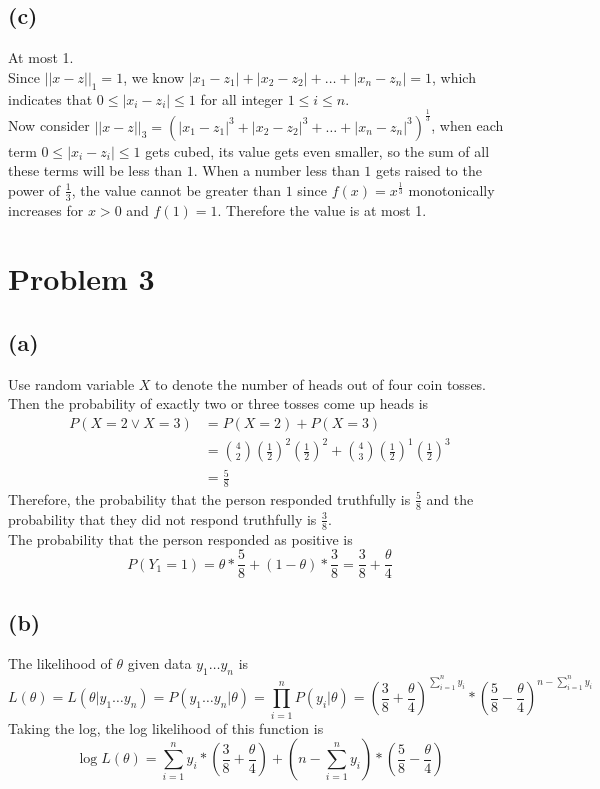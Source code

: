 \documentclass[11pt]{article}
\begin{document}
\subsection{(c)}
At most 1. \\
Since $||x-z||_1=1$, we know $|x_1-z_1|+|x_2-z_2|+\ldots+|x_n-z_n|=1$, which indicates that $0\leq|x_i-z_i|\leq1$ for all integer $1\leq i\leq n$. \\
Now consider $||x-z||_3=(|x_1-z_1|^3+|x_2-z_2|^3+\ldots+|x_n-z_n|^3)^{\frac{1}{3}}$, when each term $0\leq|x_i-z_i|\leq1$ gets cubed, its value gets even smaller, so the sum of all these terms will be less than $1$. When a number less than $1$ gets raised to the power of $\frac{1}{3}$, the value cannot be greater than $1$ since $f(x)=x^{\frac{1}{3}}$ monotonically increases for $x>0$ and $f(1)=1$. Therefore the value is at most 1.

\newpage
\section{Problem 3}
\subsection{(a)}
Use random variable $X$ to denote the number of heads out of four coin tosses. \\
Then the probability of exactly two or three tosses come up heads is 
\begin{equation}
    \begin{split}
        P(X=2 \lor X=3) &= P(X=2) + P(X=3) \\
        &= \binom{4}{2}(\frac{1}{2})^2(\frac{1}{2})^2 + \binom{4}{3}(\frac{1}{2})^1(\frac{1}{2})^3 \\
        &= \frac{5}{8}
    \end{split}
\end{equation}
Therefore, the probability that the person responded truthfully is $\frac{5}{8}$ and the probability that they did not respond truthfully is $\frac{3}{8}$. \\
The probability that the person responded as positive is
\begin{equation}
    P(Y_1=1) = \theta * \frac{5}{8} + (1-\theta)*\frac{3}{8} = \frac{3}{8}+\frac{\theta}{4}
\end{equation}

\subsection{(b)}
The likelihood of $\theta$ given data $y_1\ldots y_n$ is
\begin{equation}
    L(\theta)=L(\theta|y_1\ldots y_n)=P(y_1\ldots y_n|\theta)=\prod_{i=1}^{n} P(y_i|\theta)=(\frac{3}{8}+\frac{\theta}{4})^{\sum_{i=1}^{n}y_i}*(\frac{5}{8}-\frac{\theta}{4})^{n-\sum_{i=1}^{n}y_i}
\end{equation}
Taking the log, the log likelihood of this function is \begin{equation}
    \log L(\theta)=\sum_{i=1}^{n}y_i*(\frac{3}{8}+\frac{\theta}{4})+(n-\sum_{i=1}^{n}y_i) *(\frac{5}{8}-\frac{\theta}{4})
\end{equation}
\end{document}
